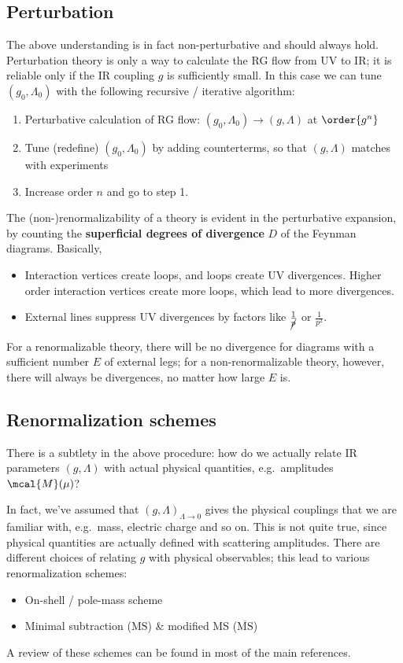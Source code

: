 \documentclass[a4paper
	,10pt
]{article}
\begin{document}
\subsection{Perturbation}
	The above understanding is in fact non-perturbative and should always hold.
	Perturbation theory is only a way to calculate the RG flow from UV to
	IR; it is reliable only if the IR coupling $g$ is sufficiently small.
	In this case we can tune $(g_0,\Lambda_0)$ with the following
	recursive / iterative algorithm:
	
	\begin{enumerate}[noitemsep]
	\item
	  Perturbative calculation of RG flow:
	  $(g_0,\Lambda_0)\to (g,\Lambda)$ at $\order{g^n}$
	\item
	  Tune (redefine) $(g_0,\Lambda_0)$ by adding counterterms, so that
	  $(g,\Lambda)$ matches with experiments
	\item
	  Increase order $n$ and go to step 1. 
	\end{enumerate}
	
	The (non-)renormalizability of a theory is evident in the perturbative
	expansion, by counting the \textbf{superficial degrees of divergence}
	$D$ of the Feynman diagrams. Basically,
	
	\begin{itemize}
	\item
	  Interaction vertices create loops, and loops create UV divergences.
	  Higher order interaction vertices create more loops, which lead to
	  more divergences.
	\item
	  External lines suppress UV divergences by factors like
	  $\frac{1}{\cancel{p}}$ or $\frac{1}{p^2}$.
	\end{itemize}
	
	For a renormalizable theory, there will be no divergence for diagrams
	with a sufficient number $E$ of external legs; for a
	non-renormalizable theory, however, there will always be divergences, no
	matter how large $E$ is.
	
\subsection{Renormalization schemes}
	
	There is a subtlety in the above procedure: how do we actually relate IR
	parameters $(g,\Lambda)$ with actual physical quantities,
	e.g.~amplitudes $\mcal{M}(\mu)$?
	
	In fact, we've assumed that $(g,\Lambda)_{\Lambda\to 0}$ gives the
	physical couplings that we are familiar with, e.g.~mass, electric charge
	and so on. This is not quite true, since physical quantities are
	actually defined with scattering amplitudes. There are different choices
	of relating $g$ with physical observables; this lead to various
	renormalization schemes:
	\begin{itemize}[noitemsep]
	\item
	  On-shell / pole-mass scheme
	\item
	  Minimal subtraction ($\mathrm{MS}$) \& modified MS
	  ($\overline{\mathrm{MS}}$)
	\end{itemize}
	A review of these schemes can be found in most of the main references. 
	
\end{document}
